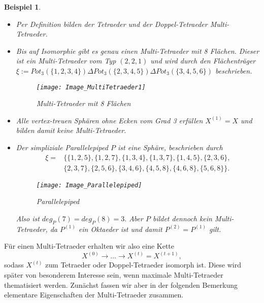 \documentclass[12pt,titlepage,twoside,cleardoublepage]{article}
\theoremstyle{nummermitklammern}
\newtheorem{bsp}[temp]{Beispiel}
\newtheorem{bsp}[zahl]{Beispiel}
\numberwithin{equation}{section}
\begin{document}
\begin{bsp} \label{bspCactus}
\begin{itemize}
\item Per Definition bilden der Tetraeder und der Doppel-Tetraeder Multi-Tetraeder.
\item Bis auf Isomorphie gibt es genau einen Multi-Tetraeder mit 8 Flächen. Dieser ist ein Multi-Tetraeder vom Typ $(2,2,1)$ und wird durch den Flächenträger $\xi:=Pot_3(\{1,2,3,4\})\Delta Pot_3(\{2,3,4,5\})\Delta Pot_3(\{3,4,5,6\})$ beschrieben. 
\begin{figure}[H]
\begin{center}
\texttt{[image: Image\_MultiTetraeder1]}
\end{center}
\caption{Multi-Tetraeder mit 8 Flächen}
\end{figure}
\item Alle vertex-treuen Sphären ohne Ecken vom Grad 3 erfüllen $X^{(1)}=X$ und bilden damit keine Multi-Tetraeder.
\item Der simpliziale Parallelepiped $P$ ist eine Sphäre, beschrieben durch 
\begin{align*}
\xi=&\{ \{1, 2, 5 \}, \{ 1, 2, 7 \}, \{ 1, 3, 4 \}, \{ 1, 3, 7 \}, \{ 1, 4, 5 \},\{ 2, 3, 6 \},\\ &\{2, 3, 7 \}, 
\{ 2, 5, 6 \}, \{ 3, 4, 6 \}, \{ 4, 5, 8 \},\{ 4, 6, 8 \}, \{ 5, 6, 8 \} \}.
\end{align*}
\begin{figure}[H]
\begin{center}
\texttt{[image: Image\_Parallelepiped]}
\end{center}
\caption{Parallelepiped}
\end{figure}
Also ist $deg_P(7)=deg_P(8)=3.$ Aber $P$ bildet dennoch kein Multi-Tetraeder, da $P^{(1)}$ ein Oktaeder ist und damit $P^{(2)}=P^{(1)}$ gilt.
\end{itemize}
\end{bsp}
Für einen Multi-Tetraeder erhalten wir also eine Kette 
\[
X^{(0)}\to \ldots \to X^{(t)}=X^{(t+1)},
\] 
sodass $X^{(t)}$ zum Tetraeder oder Doppel-Tetraeder isomorph ist.
Diese wird später von besonderem Interesse sein, wenn maximale Multi-Tetraeder thematisiert werden. Zunächst fassen wir aber in der folgenden Bemerkung elementare Eigenschaften der Multi-Tetraeder zusammen.
\end{document}
